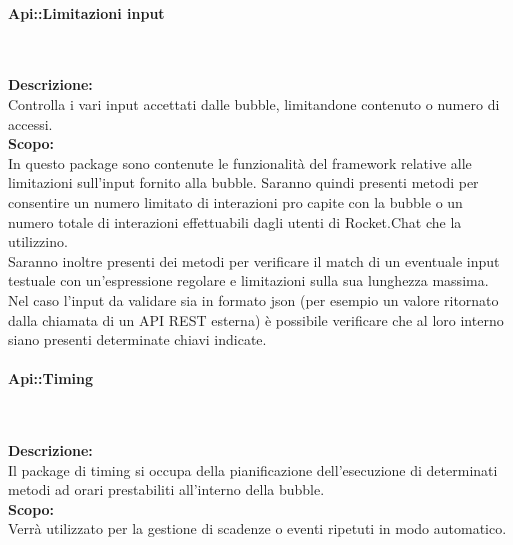 \begin{samepage}
\paragraph{Api::Limitazioni input}\label{api-limiti}\mbox{}\\
\end{samepage}
\textbf{Descrizione:}\\
Controlla i vari input accettati dalle bubble, limitandone contenuto o numero di accessi.\\
\textbf{Scopo:}\\
In questo package sono contenute le funzionalità del framework relative alle limitazioni sull'input fornito alla bubble. Saranno quindi presenti metodi per consentire un numero limitato di interazioni pro capite con la bubble o un numero totale di interazioni effettuabili dagli utenti di Rocket.Chat che la utilizzino.\\
Saranno inoltre presenti dei metodi per verificare il match di un eventuale input testuale con un'espressione regolare e limitazioni sulla sua lunghezza massima. Nel caso l'input da validare sia in formato json (per esempio un valore ritornato dalla chiamata di un API REST esterna) è possibile verificare che al loro interno siano presenti determinate chiavi indicate.

\begin{samepage}
\paragraph{Api::Timing}\label{api-timing}\mbox{}\\
\end{samepage}
\textbf{Descrizione:}\\
Il package di timing si occupa della pianificazione dell'esecuzione di determinati metodi ad orari prestabiliti all'interno della bubble.\\
\textbf{Scopo:}\\
Verrà utilizzato per la gestione di scadenze o eventi ripetuti in modo automatico.

